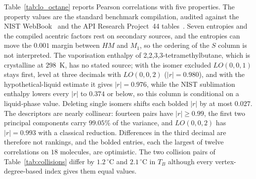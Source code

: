 Table~\ref{tab:lo_octane} reports Pearson correlations with five
properties. The property values are the standard benchmark compilation,
audited against the NIST WebBook~\cite{NISTWebBook} and the API Research
Project~44 tables~\cite{APIProject44Circ461}. Seven entropies and the
compiled acentric factors rest on secondary sources, and the entropies can
move the $0.001$ margin between $HM$ and $M_1$, so the ordering of the $S$
column is not interpreted. The vaporisation enthalpy of
2,2,3,3-tetramethylbutane, which is crystalline at $298$~K, has no stated
source; with the isomer excluded $LO(0,0,1)$ stays first, level at three
decimals with $LO(0,0,2)$ ($|r| = 0.980$), and with the
hypothetical-liquid estimate it gives $|r| = 0.976$, while the NIST
sublimation enthalpy lowers every $|r|$ to $0.374$ or below, so this column
is conditional on a liquid-phase value. Deleting single isomers shifts each
bolded $|r|$ by at most $0.027$. The descriptors are nearly collinear:
fourteen pairs have $|r| \ge 0.99$, the first two principal components
carry $99.05\%$ of the variance, and $LO(0,0,2)$ has $|r| = 0.993$ with a
classical reduction. Differences in the third decimal are therefore not
rankings, and the bolded entries, each the largest of twelve correlations
on $18$ molecules, are optimistic. The two collision pairs of
Table~\ref{tab:collisions} differ by $1.2\,^{\circ}$C and $2.1\,^{\circ}$C
in $T_B$ although every vertex-degree-based index gives them equal values.


